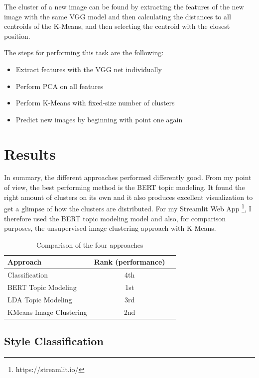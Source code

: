 \documentclass[conference]{IEEEtran}
\begin{document}
The cluster of a new image can be found by extracting the features of the new image with the same VGG model and then calculating the distances to all centroids of the K-Means, and then selecting the centroid with the closest position. 

The steps for performing this task are the following:

\begin{itemize}
\item Extract features with the VGG net individually
\item Perform PCA on all features
\item Perform K-Means with fixed-size number of clusters
\item Predict new images by beginning with point one again
\end{itemize}


\section{Results}

In summary, the different approaches performed differently good. From my point of view, the best performing method is the BERT topic modeling. It found the right amount of clusters on its own and it also produces excellent visualization to get a glimpse of how the clusters are distributed. For my Streamlit Web App \footnote{https://streamlit.io/}, I therefore used the BERT topic modeling model and also, for comparison purposes, the unsupervised image clustering approach with K-Means.

\begin{table}[h!]
  \begin{center}
    \caption{Comparison of the four approaches}
    \label{tab:table1}
    \begin{tabular}{l|c|r} %
      \textbf{Approach} & \textbf{Rank (performance)} \\
      \hline
      Classification & 4th\\
      BERT Topic Modeling & 1st\\
      LDA Topic Modeling & 3rd\\
      KMeans Image Clustering & 2nd\\
    \end{tabular}
  \end{center}
\end{table}

\subsection{Style Classification}
\end{document}
